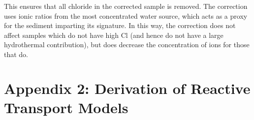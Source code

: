 This ensures that all chloride in the corrected sample is removed. The correction uses ionic ratios from the most concentrated water source, which acts as a proxy for the sediment imparting its signature.  In this way, the correction does not affect samples which do not have high Cl (and hence do not have a large hydrothermal contribution), but does decrease the concentration of ions for those that do.

\newpage


\section*{Appendix 2: Derivation of Reactive Transport Models}

\renewcommand{\thetable}{A\arabic{table}}  %

